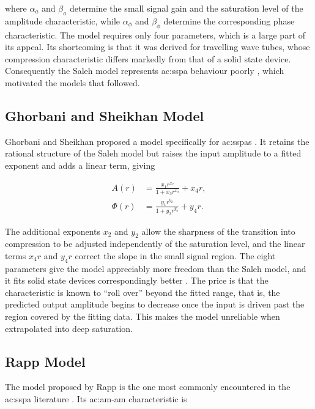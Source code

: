 where $\alpha_a$ and $\beta_a$ determine the small signal gain and the saturation level of the amplitude characteristic, while $\alpha_\phi$ and $\beta_\phi$ determine the corresponding phase characteristic. The model requires only four parameters, which is a large part of its appeal. Its shortcoming is that it was derived for travelling wave tubes, whose compression characteristic differs markedly from that of a solid state device. Consequently the Saleh model represents \gls{ac:sspa} behaviour poorly \cite{fisher}, which motivated the models that followed.

\subsection{Ghorbani and Sheikhan Model}\label{sec:ghorbani_model}

Ghorbani and Sheikhan proposed a model specifically for \glspl{ac:sspa} \cite{ghorbani}. It retains the rational structure of the Saleh model but raises the input amplitude to a fitted exponent and adds a linear term, giving

\begin{align}
  A(r)    &= \frac{x_1 r^{x_2}}{1 + x_3 r^{x_2}} + x_4 r, \label{eq:ghorbani_amam} \\
  \Phi(r) &= \frac{y_1 r^{y_2}}{1 + y_3 r^{y_2}} + y_4 r. \label{eq:ghorbani_ampm}
\end{align}

The additional exponents $x_2$ and $y_2$ allow the sharpness of the transition into compression to be adjusted independently of the saturation level, and the linear terms $x_4 r$ and $y_4 r$ correct the slope in the small signal region. The eight parameters give the model appreciably more freedom than the Saleh model, and it fits solid state devices correspondingly better \cite{fisher}. The price is that the characteristic is known to ``roll over'' beyond the fitted range, that is, the predicted output amplitude begins to decrease once the input is driven past the region covered by the fitting data. This makes the model unreliable when extrapolated into deep saturation.

\subsection{Rapp Model}\label{sec:rapp_model}

The model proposed by Rapp is the one most commonly encountered in the \gls{ac:sspa} literature \cite{rapp}. Its \gls{ac:am-am} characteristic is


